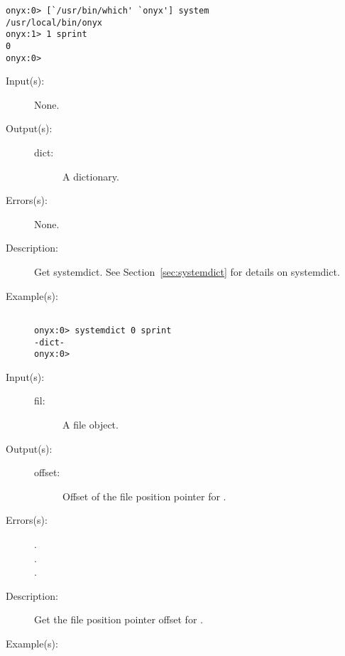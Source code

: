 \begin{description}
\begin{description}
\begin{verbatim}
onyx:0> [`/usr/bin/which' `onyx'] system
/usr/local/bin/onyx
onyx:1> 1 sprint
0
onyx:0>
		\end{verbatim}
	\end{description}
\label{systemdict:systemdict}
\item[{\onyxop{--}{systemdict}{dict}}: ]
	\begin{description}\item[]
	\item[Input(s): ] None.
	\item[Output(s): ]
		\begin{description}\item[]
		\item[dict: ]
			A dictionary.
		\end{description}
	\item[Errors(s): ] None.
	\item[Description: ]
		Get systemdict.  See Section~\ref{sec:systemdict} for details on
		systemdict.
	\item[Example(s): ]\begin{verbatim}

onyx:0> systemdict 0 sprint
-dict-
onyx:0>
		\end{verbatim}
	\end{description}
\label{systemdict:tell}
\item[{\onyxop{file}{tell}{offset}}: ]
	\begin{description}\item[]
	\item[Input(s): ]
		\begin{description}\item[]
		\item[fil: ]
			A file object.
		\end{description}
	\item[Output(s): ]
		\begin{description}\item[]
		\item[offset: ]
			Offset of the file position pointer for .
		\end{description}
	\item[Errors(s): ]
		\begin{description}\item[]
		\item[.]
		\item[.]
		\item[.]
		\end{description}
	\item[Description: ]
		Get the file position pointer offset for .
	\item[Example(s): ]\begin{verbatim}


\end{verbatim}
\end{description}
\end{description}
